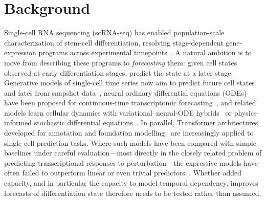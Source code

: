 \documentclass[pdflatex,sn-mathphys-num]{sn-jnl}
\theoremstyle{thmstyleone}%
\theoremstyle{thmstyletwo}%
\theoremstyle{thmstylethree}%
\begin{document}



\maketitle


\section{\textbf{Background}}
\label{sec:intro}

Single-cell RNA sequencing (scRNA-seq) has enabled population-scale characterization of stem-cell differentiation, resolving stage-dependent gene-expression programs across experimental timepoints~\cite{jerber2021population}. A natural ambition is to move from describing these programs to \emph{forecasting} them: given cell states observed at early differentiation stages, predict the state at a later stage. Generative models of single-cell time series now aim to predict future cell states and fates from snapshot data~\cite{yeo2021prescient,tong2020trajectorynet}, neural ordinary differential equations (ODEs) have been proposed for continuous-time transcriptomic forecasting~\cite{erbe2023transcriptomic}, and related models learn cellular dynamics with variational--neural-ODE hybrids~\cite{farrell2023inferring} or physics-informed stochastic differential equations~\cite{jiang2024physics}. In parallel, Transformer architectures developed for annotation and foundation modelling~\cite{chen2023transformer,cui2024scgpt} are increasingly applied to single-cell prediction tasks. Where such models have been compared with simple baselines under careful evaluation---most directly in the closely related problem of predicting transcriptional responses to perturbation---the expressive models have often failed to outperform linear or even trivial predictors~\cite{ahlmanneltze2025deep,kernfeld2023systematic}. Whether added capacity, and in particular the capacity to model temporal dependency, improves forecasts of differentiation state therefore needs to be tested rather than assumed.
\end{document}

